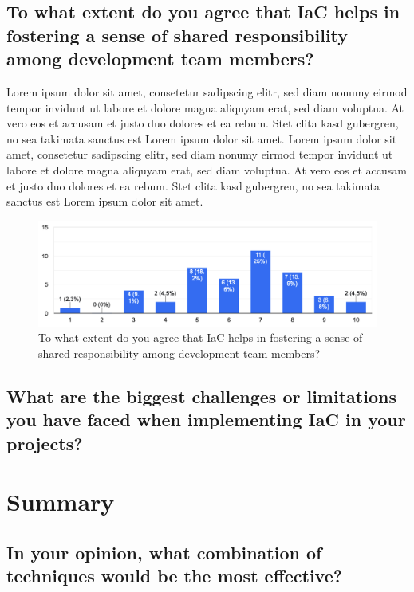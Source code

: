 \subsection{To what extent do you agree that IaC helps in fostering a sense of shared responsibility among development team members?}
Lorem ipsum dolor sit amet, consetetur sadipscing elitr, sed diam nonumy eirmod tempor invidunt ut labore et dolore magna aliquyam erat, sed diam voluptua. At vero eos et accusam et justo duo dolores et ea rebum. Stet clita kasd gubergren, no sea takimata sanctus est Lorem ipsum dolor sit amet. Lorem ipsum dolor sit amet, consetetur sadipscing elitr, sed diam nonumy eirmod tempor invidunt ut labore et dolore magna aliquyam erat, sed diam voluptua. At vero eos et accusam et justo duo dolores et ea rebum. Stet clita kasd gubergren, no sea takimata sanctus est Lorem ipsum dolor sit amet.
\begin{figure}[h!]
\centering
\includegraphics[width=\linewidth]{Images/Survey/iac_3.png}
\caption{To what extent do you agree that IaC helps in fostering a sense of shared responsibility among development team members?}
\label{fig:results:iac:3}
\end{figure}

\subsection{What are the biggest challenges or limitations you have faced when implementing IaC in your projects?}


\section{Summary}

\subsection{In your opinion, what combination of techniques would be the most effective?}


